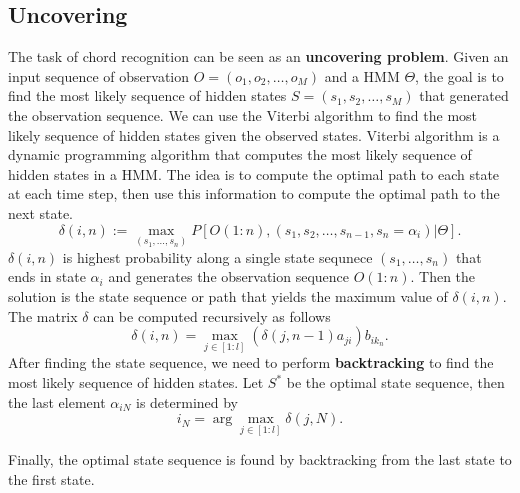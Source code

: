 \documentclass[a4paper, 9pt, twocolumn]{extarticle}
\begin{document}
\subsection{Uncovering}
\label{subsection:implementation}
The task of chord recognition can be seen as an \textbf{uncovering problem}.
Given an input sequence of observation $O = (o_1, o_2, \ldots, o_M)$ and a HMM $\Theta$, the goal is to find the most likely sequence of hidden states $S = (s_1, s_2, \ldots, s_M)$ that generated the observation sequence.
We can use the Viterbi algorithm to find the most likely sequence of hidden states given the observed states. Viterbi algorithm is a dynamic programming algorithm that computes the most likely sequence of hidden states in a HMM. 
The idea is to compute the optimal path to each state at each time step, then use this information to compute the optimal path to the next state.
\begin{equation}
    \delta(i, n) := \max_{(s_1, \ldots ,s_{n})} P[O(1:n), (s_1, s_2, \ldots, s_{n-1}, s_n = \alpha_i)| \Theta].
\end{equation}
$\delta(i,n)$ is highest probability along a single state sequnece $(s_1, \ldots, s_n)$ that ends in state $\alpha_i$ and generates the observation sequence $O(1:n)$. Then the solution is the state sequence or path that yields the maximum value of $\delta(i,n)$. The matrix $\delta$ can be computed recursively as follows
\begin{equation}
    \delta(i, n) = \max_{j \in [1:l]} (\delta(j, n-1) a_{ji} )b_{ik_n}.
\end{equation}
After finding the state sequence, we need to perform \textbf{backtracking} to find the most likely sequence of hidden states. Let $S^*$ be the optimal state sequence, then  the last element $\alpha_{iN}$ is determined by 
\begin{equation}
    i_N = \arg \max_{j \in [1:l]} \delta(j, N).
\end{equation}

Finally, the optimal state sequence is found by backtracking from the last state to the first state.

\end{document}
